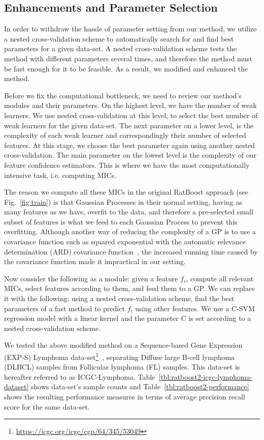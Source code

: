 \subsection{Enhancements and Parameter Selection}
In order to withdraw the hassle of parameter setting from our method, we utilize a nested cross-validation scheme to automatically search for and find best parameters for a given data-set. A nested cross-validation scheme tests the method with different parameters several times, and therefore the method must be fast enough for it to be feasible. As a result, we modified and enhanced the method.

Before we fix the computational bottleneck, we need to review our method's modules and their parameters. On the highest level, we have the number of weak learners. We use nested cross-validation at this level, to select the best number of weak learners for the given data-set. The next parameter on a lower level, is the complexity of each weak learner and correspondingly their number of selected features. At this stage, we choose the best parameter again using another nested cross-validation. The main parameter on the lowest level is the complexity of our feature confidence estimators. This is where we have the most computationally intensive task, i.e. computing MICs.

The reason we compute all these MICs in the original RatBoost approach (see Fig.~\ref{fig:train}) is that Gaussian Processes in their normal setting, having as many features as we have, overfit to the data, and therefore a pre-selected small subset of features is what we feed to each Gaussian Process to prevent this overfitting. Although another way of reducing the complexity of a GP is to use a covariance function such as squared exponential with the automatic relevance determination (ARD) covariance function~\cite{gaussian-processes}, the increased running time caused by the covariance function made it impractical in our setting.

Now consider the following as a module: given a feature $f_i$, compute all relevant MICs, select features according to them, and feed them to a GP. We can replace it with the following: using a nested cross-validation scheme, find the best parameters of a fast method to predict $f_i$ using other features. We use a C-SVM regression model with a linear kernel and the parameter C is set according to a nested cross-validation scheme.

We tested the above modified method on a Sequence-based Gene Expression (EXP-S) Lymphoma data-set\footnote{\url{https://icgc.org/icgc/cgp/64/345/53049}}~\cite{richter2012recurrent}, separating Diffuse large B-cell lymphoma (DLBCL) samples from Follicular lymphoma (FL) samples. This data-set is hereafter referred to as ICGC-Lymphoma. Table~\ref{tbl:ratboost2-icgc-lymphoma-dataset} shows data-set's sample counts and Table~\ref{tbl:ratboost2-performance} shows the resulting performance measures in terms of average precision recall score for the same data-set. 

